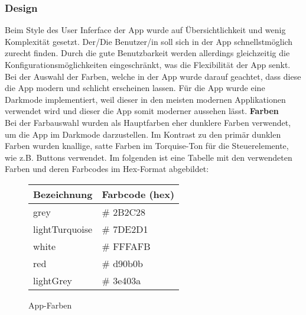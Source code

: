 \documentclass[11pt, twoside]{article}
\begin{document}
\subsubsection{Design}
Beim Style des User Inferface der App wurde auf Übersichtlichkeit und wenig Komplexität gesetzt. Der/Die Benutzer/in soll sich in der App schnellstmöglich zurecht finden. Durch die gute Benutzbarkeit werden allerdings gleichzeitig die Konfigurationsmöglichkeiten eingeschränkt, was die Flexibilität der App senkt. Bei der Auswahl der Farben, welche in der App wurde darauf geachtet, dass diese die App modern und schlicht erscheinen lassen. Für die App wurde eine Darkmode implementiert, weil dieser in den meisten modernen Applikationen verwendet wird und dieser die App somit moderner aussehen lässt.
\textbf{Farben} \\
Bei der Farbauswahl wurden als Hauptfarben eher dunklere Farben verwendet, um die App im Darkmode darzustellen. Im Kontrast zu den primär dunklen Farben wurden knallige, satte Farben im Torquise-Ton für die Steuerelemente, wie z.B. Buttons verwendet. Im folgenden ist eine Tabelle mit den verwendeten Farben und deren Farbcodes im Hex-Format abgebildet: \\
\begin{figure}
\begin{tabular}{|l|l|}
\hline
\textbf{Bezeichnung} & \textbf{Farbcode (hex)} \\
\hline
grey & \# 2B2C28 \\
\hline 
lightTurquoise & \# 7DE2D1 \\
\hline 
white & \# FFFAFB \\
\hline 
red & \# d90b0b \\
\hline 
lightGrey & \# 3e403a \\
\hline 
\end{tabular} 
\caption{App-Farben}
\end{figure}
\FloatBarrier
\end{document}
